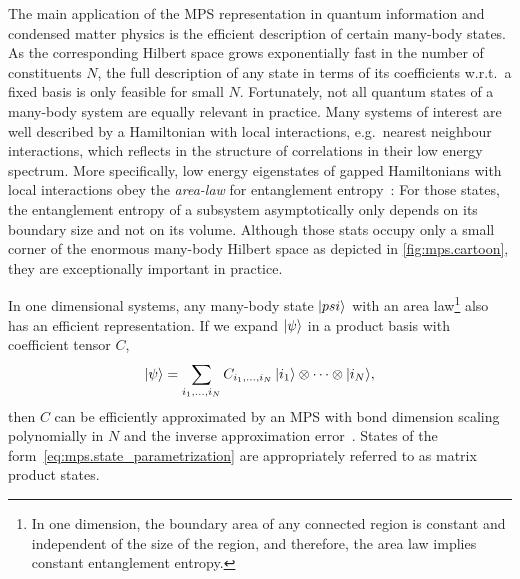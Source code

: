 \begin{figure*}[t]
  \centering
  \caption{\label{fig:mps.cartoon}%
    The manifold of quantum states with an efficient MPS description occupies only a tiny corner in the full Hilbert space.
  }
\end{figure*}

The main application of the MPS representation in quantum information and condensed matter physics is the efficient description of certain many-body states.
As the corresponding Hilbert space grows exponentially fast in the number of constituents $N$, the full description of any state in terms of its coefficients w.r.t.\ a fixed basis is only feasible for small $N$.
Fortunately, not all quantum states of a many-body system are equally relevant in practice.
Many systems of interest are well described by a Hamiltonian with local interactions, e.g.\ nearest neighbour interactions, which reflects in the structure of correlations in their low energy spectrum.
More specifically, low energy eigenstates of gapped Hamiltonians with local interactions obey the \emph{area-law} for entanglement entropy~\cite{Hastings,Cirac}:
For those states, the entanglement entropy of a subsystem asymptotically only depends on its boundary size and not on its volume.
Although those stats occupy only a small corner of the enormous many-body Hilbert space as depicted in \cref{fig:mps.cartoon}, they are exceptionally important in practice.

In one dimensional systems, any many-body state $\ket{psi}$ with an area law\footnote{%
  In one dimension, the boundary area of any connected region is constant and independent of the size of the region, and therefore, the area law implies constant entanglement entropy.
}
also has an efficient representation.
If we expand $\ket{\psi}$ in a product basis with coefficient tensor $C$,
\[
  \ket\psi = \sum_{i_1,\ldots,i_N} C_{i_1,\ldots,i_N} \, \ket{i_1} \otimes \cdots \otimes \ket{i_N},
  \label{eq:mps.state_parametrization}
\]
then $C$ can be efficiently approximated by an MPS with bond dimension scaling polynomially in $N$ and the inverse approximation error~\cite{hastings,arad}.
States of the form~\eqref{eq:mps.state_parametrization} are appropriately referred to as matrix product states.

